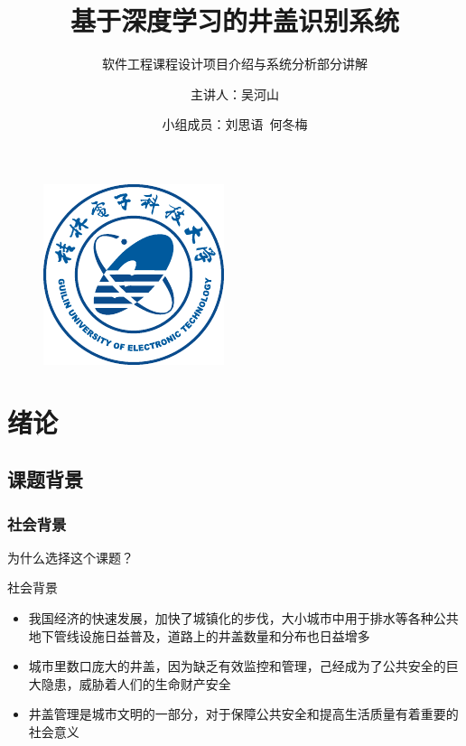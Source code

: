 \documentclass{beamer}
\author{主讲人：吴河山}
\title{基于深度学习的井盖识别系统}
\subtitle{软件工程课程设计\newline 项目介绍与系统分析部分讲解}
\institute{计算机与信息安全学院}
\date{小组成员：刘思语\, 何冬梅}
\begin{document}
\kaishu
\begin{frame}
    \titlepage
    \begin{figure}[htpb]
        \begin{center}
            \includegraphics[width=0.2\linewidth]{Guet-logo.pdf}
        \end{center}
    \end{figure}
\end{frame}

\begin{frame}
    \tableofcontents[sectionstyle=show,subsectionstyle=show/shaded/hide,subsubsectionstyle=show/shaded/hide]
\end{frame}


\section{绪论}
\subsection{课题背景}
\subsubsection{社会背景}
\begin{frame}{为什么选择这个课题？}
\begin{textbox}{社会背景}
    \begin{itemize}[<+-| alert@+>] %
        \item 我国经济的快速发展，加快了城镇化的步伐，大小城市中用于排水等各种公共地下管线设施日益普及，道路上的井盖数量和分布也日益增多
        \item 城市里数口庞大的井盖，因为缺乏有效监控和管理，己经成为了公共安全的巨大隐患，威胁着人们的生命财产安全
        \item 井盖管理是城市文明的一部分，对于保障公共安全和提高生活质量有着重要的社会意义
    \end{itemize}
\end{textbox}
    
\end{frame}
\end{document}
